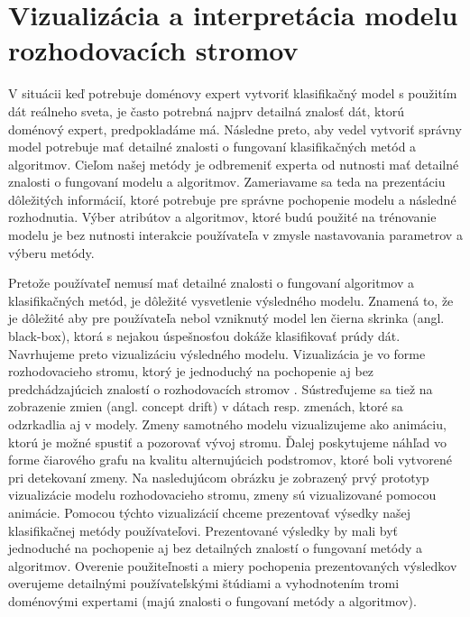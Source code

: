\chapter{Vizualizácia a interpretácia modelu rozhodovacích stromov}
\label{my-method-prezentacia-vysledkov}
V situácii keď potrebuje doménovy expert vytvoriť klasifikačný model s použitím dát reálneho sveta, je často potrebná najprv detailná znalosť dát, ktorú doménový expert, predpokladáme má.  Následne preto, aby vedel vytvoriť správny model potrebuje mať detailné znalosti o fungovaní klasifikačných metód a algoritmov. Cieľom našej metódy je odbremeniť experta od nutnosti mať detailné znalosti o fungovaní modelu a algoritmov. Zameriavame sa teda na prezentáciu dôležitých informácií, ktoré potrebuje pre správne pochopenie modelu a následné rozhodnutia. Výber atribútov a algoritmov, ktoré budú použité na trénovanie modelu je bez nutnosti interakcie používateľa v zmysle nastavovania parametrov a výberu metódy. 
\par
Pretože používateľ nemusí mať detailné znalosti o fungovaní algoritmov a klasifikačných metód, je dôležité vysvetlenie výsledného modelu. Znamená to, že je dôležité aby pre používateľa nebol vzniknutý model len čierna skrinka (angl. black-box), ktorá s nejakou úspešnosťou dokáže klasifikovať prúdy dát. Navrhujeme preto vizualizáciu výsledného modelu. Vizualizácia je vo forme rozhodovacieho stromu, ktorý je jednoduchý na pochopenie aj bez predchádzajúcich znalostí o rozhodovacích stromov \citep{nguyen2015survey}. Sústreďujeme sa tiež na zobrazenie zmien (angl. concept drift) v dátach resp. zmenách, ktoré sa odzrkadlia aj v modely. Zmeny samotného modelu vizualizujeme ako animáciu, ktorú je možné spustiť a pozorovať vývoj stromu. Ďalej poskytujeme náhľad vo forme čiarového grafu na kvalitu alternujúcich podstromov, ktoré boli vytvorené pri detekovaní zmeny. Na nasledujúcom obrázku je zobrazený prvý prototyp vizualizácie modelu rozhodovacieho stromu, zmeny sú vizualizované pomocou animácie.
\label{fig:exp-vis-prototype}
Pomocou týchto vizualizácií chceme prezentovať výsedky našej klasifikačnej metódy používateľovi. Prezentované výsledky by mali byť jednoduché na pochopenie aj bez detailných znalostí o fungovaní metódy a algoritmov. Overenie použiteľnosti a miery pochopenia prezentovaných výsledkov overujeme detailnými používateľskými štúdiami a vyhodnotením tromi doménovými expertami (majú znalosti o fungovaní metódy a algoritmov). 


